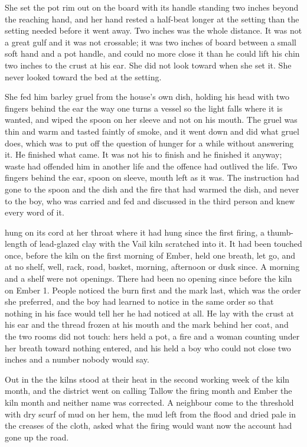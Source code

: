 She set the pot rim out on the board with its handle standing two inches beyond the reaching hand, and her hand rested a half-beat longer at the setting than the setting needed before it went away. Two inches was the whole distance. It was not a great gulf and it was not crossable; it was two inches of board between a small soft hand and a pot handle, and  could no more close it than he could lift his chin two inches to the crust at his ear. She did not look toward  when she set it. She never looked toward the bed at the setting.

\scenebreak

She fed him barley gruel from the house's own dish, holding his head with two fingers behind the ear the way one turns a vessel so the light falls where it is wanted, and wiped the spoon on her sleeve and not on his mouth. The gruel was thin and warm and tasted faintly of smoke, and it went down and did what gruel does, which was to put off the question of hunger for a while without answering it. He finished what came. It was not his to finish and he finished it anyway; waste had offended him in another life and the offence had outlived the life. Two fingers behind the ear, spoon on sleeve, mouth left as it was. The instruction had gone to the spoon and the dish and the fire that had warmed the dish, and never to the boy, who was carried and fed and discussed in the third person and knew every word of it.

 hung on its cord at her throat where it had hung since the first firing, a thumb-length of lead-glazed clay with the Vail kiln scratched into it. It had been touched once, before the kiln on the first morning of Ember, held one breath, let go, and at no shelf, well, rack, road, basket, morning, afternoon or dusk since. A morning and a shelf were not openings. There had been no opening since before the kiln on Ember 1. People noticed the burn first and the mark last, which was the order she preferred, and the boy had learned to notice in the same order so that nothing in his face would tell her he had noticed at all. He lay with the crust at his ear and the thread frozen at his mouth and the mark behind her coat, and the two rooms did not touch: hers held a pot, a fire and a woman counting under her breath toward nothing entered, and his held a boy who could not close two inches and a number nobody would say.

Out in the  the kilns stood at their heat in the second working week of the kiln month, and the district went on calling Tallow the firing month and Ember the kiln month and neither name was corrected. A neighbour come to the threshold with dry scurf of mud on her hem, the mud left from the flood and dried pale in the creases of the cloth, asked what the firing would want now the account had gone up the road.

